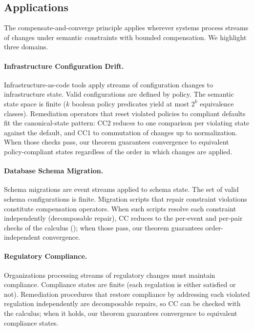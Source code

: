 \documentclass[11pt,a4paper]{article}
\theoremstyle{plain}
\theoremstyle{definition}
\theoremstyle{remark}
\begin{document}
\subsection{Applications}

The compensate-and-converge principle applies wherever systems process streams
of changes under semantic constraints with bounded compensation.  We highlight
three domains.

\paragraph{Infrastructure Configuration Drift.}
Infrastructure-as-code tools apply streams of configuration changes to
infrastructure state.  Valid configurations are defined by policy.  The
semantic state space is finite ($k$ boolean policy predicates yield at most
$2^k$ equivalence classes).  Remediation operators that reset violated policies
to compliant defaults fit the canonical-state pattern: CC2 reduces to one
comparison per violating state against the default, and CC1 to commutation of
changes up to normalization.  When those checks pass, our theorem guarantees
convergence to equivalent policy-compliant states regardless of the order in
which changes are applied.

\paragraph{Database Schema Migration.}
Schema migrations are event streams applied to schema state.  The set of valid
schema configurations is finite.  Migration scripts that repair constraint
violations constitute compensation operators.  When such scripts resolve each
constraint independently (decomposable repair), CC reduces to the per-event
and per-pair checks of the calculus (); when those pass,
our theorem guarantees order-independent convergence.

\paragraph{Regulatory Compliance.}
Organizations processing streams of regulatory changes must maintain
compliance.  Compliance states are finite (each regulation is either satisfied
or not).  Remediation procedures that restore compliance by addressing each
violated regulation independently are decomposable repairs, so CC can be
checked with the calculus; when it holds, our theorem guarantees convergence
to equivalent compliance states.
\end{document}
